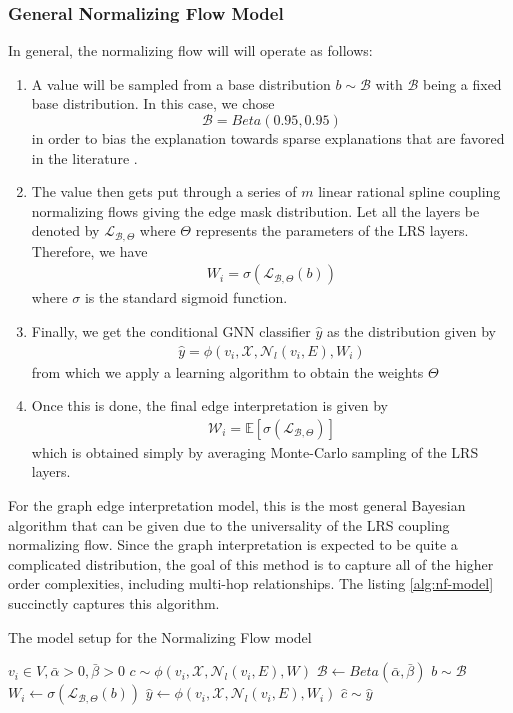 \subsubsection{General Normalizing Flow Model}
In general, the normalizing flow will will operate as follows:
\begin{enumerate}
	\item A value will be sampled from a base distribution $b \sim \mathcal{B}$ with $\mathcal{B}$ being a fixed base distribution. In this case, we chose 
	\[
		\mathcal{B} = Beta(0.95, 0.95)
	\]
	in order to bias the explanation towards sparse explanations that are favored in the literature \cite{yuan_explainability_2021}.
	\item The value then gets put through a series of $m$ linear rational spline coupling normalizing flows giving the edge mask distribution. Let all the layers be denoted by $\mathcal{L}_{\mathcal{B}, \Theta}$ where $\Theta$ represents the parameters of the LRS layers. Therefore, we have
	\begin{align*}
		W_i = \sigma(\mathcal{L}_{\mathcal{B}, \Theta}(b))
	\end{align*}
	where $\sigma$ is the standard sigmoid function.
	\item Finally, we get the conditional GNN classifier $\hat{y}$ as the distribution given by
	\begin{align*}
		\hat{y} = \phi(v_i, \mathcal{X}, \mathcal{N}_l(v_i, E), W_i)
	\end{align*}
	from which we apply a learning algorithm to obtain the weights $\Theta$
	\item Once this is done, the final edge interpretation is given by
	\begin{align*}
		\mathcal{W}_i = \mathbb{E}[\sigma(\mathcal{L}_{\mathcal{B}, \Theta})]
	\end{align*}
	which is obtained simply by averaging Monte-Carlo sampling of the LRS layers.
\end{enumerate}
For the graph edge interpretation model, this is the most general Bayesian algorithm that can be given due to the universality of the LRS coupling normalizing flow. Since the graph interpretation is expected to be quite a complicated distribution, the goal of this method is to capture all of the higher order complexities, including multi-hop relationships. The listing \ref{alg:nf-model} succinctly captures this algorithm.
\begin{algorithm}[h]
	\centering
	\caption{The model setup for the Normalizing Flow model}
	\label{alg:nf-model}
	\begin{algorithmic}
		\Require $v_i \in V, \bar{\alpha} > 0, \bar{\beta} > 0$
		\Require $c \sim \phi(v_i, \mathcal{X}, \mathcal{N}_l(v_i, E), W)$
		\State $\mathcal{B} \gets Beta(\bar{\alpha}, \bar{\beta})$
		\State $b \sim \mathcal{B}$
		\State $W_i \gets \sigma(\mathcal{L}_{\mathcal{B}, \Theta}(b))$
		\State $\hat{y} \gets \phi(v_i, \mathcal{X}, \mathcal{N}_l(v_i, E), W_i)$
		\State $\hat{c} \sim \hat{y}$
	\end{algorithmic}
\end{algorithm}

